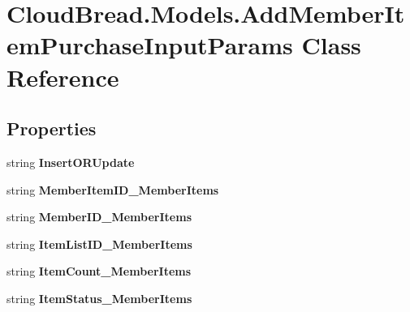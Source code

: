 \hypertarget{a00004}{}\section{Cloud\+Bread.\+Models.\+Add\+Member\+Item\+Purchase\+Input\+Params Class Reference}
\label{a00004}
\subsection*{Properties}
\begin{DoxyCompactItemize}
\item 
string {\bfseries Insert\+O\+R\+Update}\hypertarget{a00004_a73cf165a3a058f81bc15e87b93b939b2}{}\label{a00004_a73cf165a3a058f81bc15e87b93b939b2}

\item 
string {\bfseries Member\+Item\+I\+D\+\_\+\+Member\+Items}\hypertarget{a00004_a2b8c0077efc2d95c45af47c919246072}{}\label{a00004_a2b8c0077efc2d95c45af47c919246072}

\item 
string {\bfseries Member\+I\+D\+\_\+\+Member\+Items}\hypertarget{a00004_a0adff1fe6a0ab5673b2f1e88fbc727a2}{}\label{a00004_a0adff1fe6a0ab5673b2f1e88fbc727a2}

\item 
string {\bfseries Item\+List\+I\+D\+\_\+\+Member\+Items}\hypertarget{a00004_a07f8c1eecccbafd0f2434ba9f5d7f5e2}{}\label{a00004_a07f8c1eecccbafd0f2434ba9f5d7f5e2}

\item 
string {\bfseries Item\+Count\+\_\+\+Member\+Items}\hypertarget{a00004_a6194a55823dbcdaa7cf19b4b34bc0a47}{}\label{a00004_a6194a55823dbcdaa7cf19b4b34bc0a47}

\item 
string {\bfseries Item\+Status\+\_\+\+Member\+Items}\hypertarget{a00004_aee897af1ca350d7d37ccd38e99ff6667}{}\label{a00004_aee897af1ca350d7d37ccd38e99ff6667}


\end{DoxyCompactItemize}
